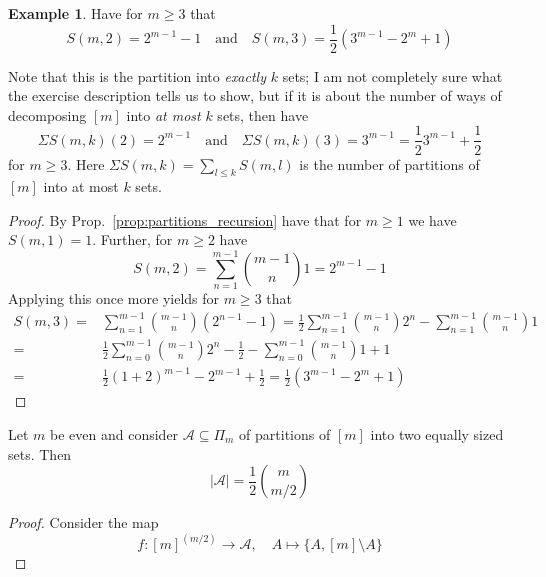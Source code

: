 \documentclass{scrartcl}
\theoremstyle{definition}
\newtheorem{example}[definition]{Example}
\begin{document}
\begin{example}
    Have for $m \geq 3$ that
    \begin{equation*}
        S(m, 2) = 2^{m - 1} - 1 \quad \text{and} \quad S(m, 3) = \frac 1 2 (3^{m - 1} - 2^m + 1)
    \end{equation*}

    Note that this is the partition into \emph{exactly} $k$ sets; 
    I am not completely sure what the exercise description tells us to show, but if it is about the number of ways of decomposing $[m]$ into \emph{at most} $k$ sets, then have
    \begin{equation*}
        \Sigma S(m, k)(2) = 2^{m - 1} \quad \text{and} \quad \Sigma S(m, k)(3) = 3^{m - 1} = \frac 1 2 3^{m - 1} + \frac 1 2
    \end{equation*}
    for $m \geq 3$.
    Here $\Sigma S(m, k) = \sum_{l \leq k} S(m, l)$ is the number of partitions of $[m]$ into at most $k$ sets.
    \begin{proof}
        By Prop.~\ref{prop:partitions_recursion} have that for $m \geq 1$ we have $S(m, 1) = 1$.
        Further, for $m \geq 2$ have
        \begin{equation*}
            S(m, 2) = \sum_{n = 1}^{m - 1} {m - 1 \choose n} 1 = 2^{m - 1} - 1
        \end{equation*}
        Applying this once more yields for $m \geq 3$ that
        \begin{align*}
            S(m, 3) =& \sum_{n = 1}^{m - 1} {m - 1 \choose n} (2^{n - 1} - 1) = \frac 1 2 \sum_{n = 1}^{m - 1} {m - 1 \choose n} 2^n - \sum_{n = 1}^{m - 1} {m - 1 \choose n} 1 \\
            =&\frac 1 2 \sum_{n = 0}^{m - 1} {m - 1 \choose n} 2^n - \frac 1 2 - \sum_{n = 0}^{m - 1} {m - 1 \choose n} 1 + 1 \\
            =& \frac 1 2 (1 + 2)^{m - 1} - 2^{m - 1} + \frac 1 2 = \frac 1 2 (3^{m - 1} - 2^m + 1)
        \end{align*}
    \end{proof}
    Let $m$ be even and consider $\mathcal{A} \subseteq \Pi_m$ of partitions of $[m]$ into two equally sized sets.
    Then
    \begin{equation*}
        |\mathcal{A}| = \frac 1 2 {m \choose m/2}
    \end{equation*}
    \begin{proof}
        Consider the map
        \begin{equation*}
            f: [m]^{(m/2)} \to \mathcal{A}, \quad A \mapsto \{ A, [m] \setminus A \}

\end{equation*}
\end{proof}
\end{example}
\end{document}
